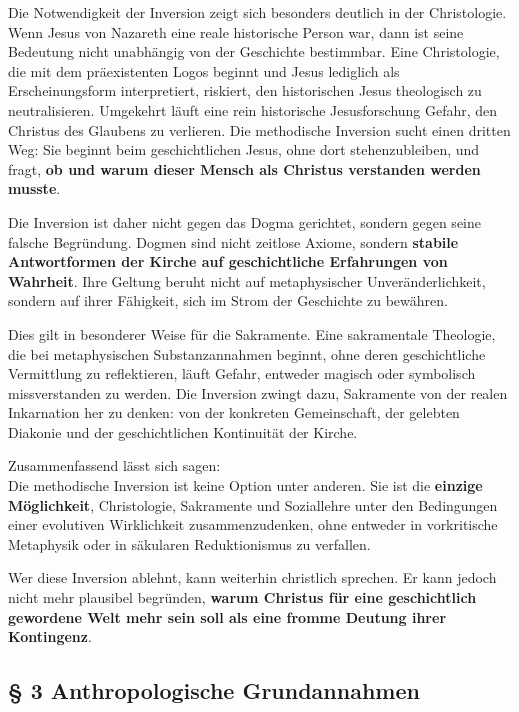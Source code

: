 \documentclass[
]{article}
\begin{document}
Die Notwendigkeit der Inversion zeigt sich besonders deutlich in der Christologie. Wenn Jesus von Nazareth eine reale historische Person war, dann ist seine Bedeutung nicht unabhängig von der Geschichte bestimmbar. Eine Christologie, die mit dem präexistenten Logos beginnt und Jesus lediglich als Erscheinungsform interpretiert, riskiert, den historischen Jesus theologisch zu neutralisieren. Umgekehrt läuft eine rein historische Jesusforschung Gefahr, den Christus des Glaubens zu verlieren. Die methodische Inversion sucht einen dritten Weg: Sie beginnt beim geschichtlichen Jesus, ohne dort stehenzubleiben, und fragt, \textbf{ob und warum dieser Mensch als Christus verstanden werden musste}.

Die Inversion ist daher nicht gegen das Dogma gerichtet, sondern gegen seine falsche Begründung. Dogmen sind nicht zeitlose Axiome, sondern \textbf{stabile Antwortformen der Kirche auf geschichtliche Erfahrungen von Wahrheit}. Ihre Geltung beruht nicht auf metaphysischer Unveränderlichkeit, sondern auf ihrer Fähigkeit, sich im Strom der Geschichte zu bewähren.

Dies gilt in besonderer Weise für die Sakramente. Eine sakramentale Theologie, die bei metaphysischen Substanzannahmen beginnt, ohne deren geschichtliche Vermittlung zu reflektieren, läuft Gefahr, entweder magisch oder symbolisch missverstanden zu werden. Die Inversion zwingt dazu, Sakramente von der realen Inkarnation her zu denken: von der konkreten Gemeinschaft, der gelebten Diakonie und der geschichtlichen Kontinuität der Kirche.

Zusammenfassend lässt sich sagen:\\
Die methodische Inversion ist keine Option unter anderen. Sie ist die \textbf{einzige Möglichkeit}, Christologie, Sakramente und Soziallehre unter den Bedingungen einer evolutiven Wirklichkeit zusammenzudenken, ohne entweder in vorkritische Metaphysik oder in säkularen Reduktionismus zu verfallen.

Wer diese Inversion ablehnt, kann weiterhin christlich sprechen. Er kann jedoch nicht mehr plausibel begründen, \textbf{warum Christus für eine geschichtlich gewordene Welt mehr sein soll als eine fromme Deutung ihrer Kontingenz}.

\subsection{\texorpdfstring{\textbf{§ 3 Anthropologische Grundannahmen}}{§ 3 Anthropologische Grundannahmen}}\label{anthropologische-grundannahmen}
\end{document}
